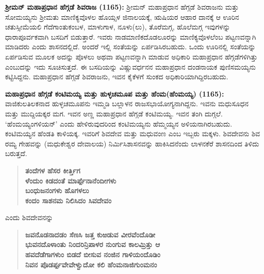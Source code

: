 \textbf{ಶ‍್ರೀಮನ್​ ಮಹಾಪ್ರಧಾನ ಹೆಗ್ಗಡೆ ಶಿವರಾಜ (1165):} ಶ‍್ರೀಮನ್​ ಮಹಾಪ್ರಧಾನ ಹೆಗ್ಗಡೆ ಶಿವರಾಜನು ಮತ್ತು ಸೋಮಯ್ಯನು ಶ‍್ರೀಮತು ಮಾಣಿಕ್ಯವೊಳಲ ಹೊಯ್ಸಳ ಜಿನಾಲಯಕ್ಕೆ, ಋಷಿಯರ ಆಹಾರ ದಾನಕ್ಕೆ ಆ ಊರಿನ ಚತುಸ್ಸೀಮೆಯಲಿ ಗೆದೆಗಾಂತುಕಂಬಳ, ಮಾಳುಗಾಳ, ನೂಳು(ಲು), ತೊರೆಮಗ್ಗ, ಹೊಲೆಮಗ್ಗ ಇವುಗಳನ್ನು ಧಾರಾಪೂರ್ವಕವಾಗಿ ಬಸದಿಗೆ ಬಿಡುತ್ತಾರೆ. ಇವರು ನಾಡಮಾಣಿಕದೊಡಲೂರನ್ನು ಮಾಣಿಕ್ಯವೊಳಲೆಂಬ ಪಟ್ಟಣವನ್ನಾಗಿ ಮಾಡಿದರು ಎಂದು ಶಾಸನದಲ್ಲಿದೆ. ಅಂದರೆ ಇಲ್ಲಿ ಸಂತೆಯನ್ನು ಏರ್ಪಡಿಸಿರಬಹುದು. ಒಂದು ಊರಿನಲ್ಲಿ ಸಂತೆಯನ್ನು ಏರ್ಪಡಿಸುವ ಮೂಲಕ ಅದನ್ನು ಪೊಳಲು ಅಥವಾ ಪಟ್ಟಣವನ್ನಾಗಿ ಮಾಡುವ ಅಧಿಕಾರಿ ಮಹಾಪ್ರಧಾನ ಹೆಗ್ಗಡೆಗಳಿಗಿತ್ತು ಎಂಬುದನ್ನು ಇದು ಸೂಚಿಸುತ್ತದೆ. ಈ ಬಸದಿಯನ್ನು ವಿಷ್ಣುವರ್ಧನನ ಮಹಾಪ್ರಧಾನ ದಂಡನಾಯಕ ಪುಣಿಸಮಯ್ಯನು ಕಟ್ಟಿಸಿದ್ದನು. ಮಹಾಪ್ರಧಾನ ಹೆಗ್ಗಡೆ ಶಿವರಾಜನು, ಇವನ ಕೈಕೆಳಗೆ ಸುಂಕದ ಅಧಿಕಾರಿಯಾಗಿದ್ದಿರಬಹುದು.

\textbf{ಮಹಾಪ್ರಧಾನ ಹೆಗ್ಗಡೆ ಕಂಟಿಮಯ್ಯ ಮತ್ತು ಹುಳ್ಳಚಮೂಪ ಮತ್ತು ಹೆಂಮ(ಹೆಂಮಯ್ಯ) (1165):} ವಾಜಿಕುಲ\-ತಿಲಕನಾದ ಹುಳ್ಳಚಮೂಪನು ಇಮ್ಮಡಿ ಬಲ್ಲಾಳನ ರಾಜಸಭಾಯೋಗ್ಯನಾಗಿದ್ದನು. ಇವನು ಮಧುಸೂಧನ ಮತ್ತು ಮುದ್ದಿಯಕ್ಕರ ಮಗ. ಇವನ ಅಣ್ಣ ಮಹಾಪ್ರಧಾನ ಹೆಗ್ಗಡೆ ಕಂಟಿಮಯ್ಯ. ಇವನ ತಂಗಿ ದುಗ್ಗಲೆ. ‘ಹೆಂಮಯ್ಯಂಗಳಿಯನ್​’ ಎಂದು ಹೇಳಿರುವುದರಿಂದ ಕಂಟಿಮಯ್ಯನು ಹೆಮ್ಮಯ್ಯನ ಅಳಿಯನಾಗಿರಬಹುದು. ಕಂಟಿಮಯ್ಯನ ಹೆಂಡತಿ ಕಾಳಿಯಕ್ಕ. ಇವರಿಗೆ ಶಿವದೇವ ಮತ್ತು ಮಧುವಂಣ ಎಂಬ ಇಬ್ಬರು ಮಕ್ಕಳು. ಶಿವದೇವನು ಶಿವ ರಮ್ಯ ಗೇಹವನ್ನು (ಮಧುಕೇಶ್ವರ ದೇವಾಲಯ) ನಿರ್ಮಿಸಿ\break ಶಾಸನವನ್ನು ಹಾಕಿಸಿದನೆಂದು ಲಾಳನಕೆರೆ ಶಾಸನದಿಂದ ತಿಳಿದು ಬರುತ್ತದೆ.

\begin{verse}
\textbf{ತಂದೆಗಳ ಹೆಸರ ಕೀರ್ತ್ತಿಗ} \\\textbf{ಳೆಂದುಂ ಕಿಡದಂತೆ ಮಾರ್ಪ್ಪೆನಾನೆಂದೀಗಳು} \\\textbf{ಬಂಧುಜನಂಗಳು ಹೊಗಳಲು} \\\textbf{ ಕಂದಂ ಸಾಶನಮ ನಿಲಿಸಿದಂ ಸಿವದೇವಂ}
\end{verse}

ಎಂದು ಶಿವದೇವನನ್ನು

\begin{verse}
\textbf{ಜವನೊಡನಾದಡಂ ಸೆಣಸಿ ಜತ್ತ ಕುಱಡುವ ವೀರವೆಂದೊಡೀ} \\\textbf{ ಭುವನದೊಳಾಂತು ನಿಂದರಿನ್ರಿಪಾಳರ ನುಂಗುವ ಕಾಲಮ್ರಿತ್ತು ಆ} \\\textbf{ ಹವದೆಡೆಗಾಗಳುಂ ಬಿಡದೆ ಬೀಸುವ ನಂಜಿನ ಗಾಳಿಯಂದೊಡಿಂ} \\\textbf{ ನಿವನ ಪೊಡರ್ಪ್ಪವೇವೇಳ್ವುದೋ ಕಲಿ ಹೆಂಮನಾಜಿಗುಂಮನಂ}
\end{verse}

